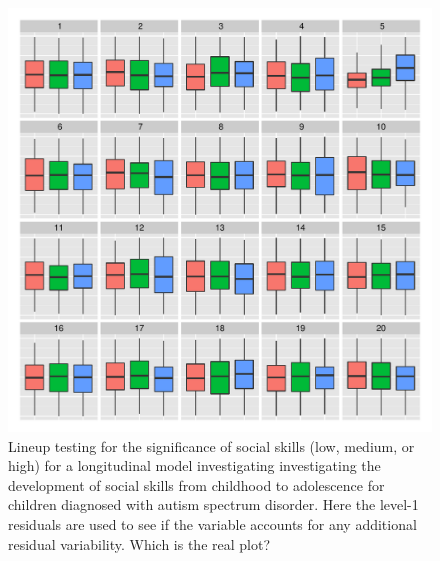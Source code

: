\documentclass{article} %
\begin{document}

\begin{figure}
	\centering
	\includegraphics[width=\textwidth]{autism_sicdegp_level1_lineup5.pdf}
	\caption{\label{fig:boxplot-ordered} Lineup testing for the significance of social skills (low, medium, or high) for a longitudinal model investigating investigating the development of social skills from childhood to adolescence for children diagnosed with autism spectrum disorder. Here the level-1 residuals are used to see if the variable accounts for any additional residual variability. Which is the real plot?}
\end{figure}
\end{document}
